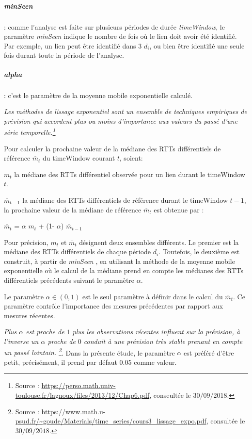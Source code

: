 \subparagraph{minSeen} : comme l'analyse est faite sur plusieurs périodes de durée \textit{timeWindow}, le paramètre \textit{minSeen} indique le nombre de fois où le lien doit avoir été identifié. Par exemple, un lien peut être identifié dans $3$ $d_i$, ou bien être identifié  une seule fois durant toute la période de l'analyse.

\subparagraph{alpha}: c'est le paramètre de la  moyenne mobile exponentielle calculé.

\guillemotleft \textit{ Les méthodes de lissage exponentiel  sont un ensemble de techniques empiriques de prévision qui accordent plus ou moins d'importance aux valeurs du passé d'une série temporelle.\footnote{Source : \url{https://perso.math.univ-toulouse.fr/lagnoux/files/2013/12/Chap6.pdf}, conseultée le $30/09/2018.$}} \guillemotright

Pour calculer la prochaine  valeur de la médiane des RTTs différentiels de référence $ \overline{m}_{t}$ du timeWindow  courant $ t $, soient: 

$m_t$ la médiane des RTTs différentiel observée pour un lien durant le timeWindow $t$. 

$ \overline{m}_{t-1}$  la médiane des  RTTs différentiels  de référence durant le timeWindow $ t-1 $,  la prochaine  valeur de la médiane de référence $ \overline{m}_{t}$ est obtenue par : 

\begin{center}
	$ \overline{m}_{t}$ =  $\alpha$ ${m}_{t}$ + (1-  $\alpha$) $ \overline{m}_{t-1}$
\end{center}
Pour précision, $m_t$ et $ \overline{m}_{t}$ désignent deux ensembles différents. Le premier est la médiane des RTTs différentiels de chaque période $d_i$. Toutefois, le deuxième est construit, à partir de \textit{minSeen} , en utilisant la méthode de la moyenne mobile exponentielle où le calcul de la médiane prend en compte les médianes des RTTs différentiels précédents suivant le paramètre $\alpha$.

Le paramètre  $\alpha \in (0, 1)$ est le seul paramètre à définir dans le calcul du $ \overline{m}_{t}$.  Ce paramètre contrôle l'importance  des mesures précédentes par rapport aux mesures récentes.

\guillemotleft \textit{Plus $\alpha$ est proche de $ 1 $ plus les observations récentes influent sur la prévision, à l'inverse un $\alpha$ proche de $0$ conduit à une prévision très stable prenant en compte un passé lointain. \footnote{Source : \url{https://www.math.u-psud.fr/~goude/Materials/time_series/cours3_lissage_expo.pdf}, consultée le $30/09/2018$.}}\guillemotright.  Dans la présente étude, le paramètre $\alpha$ est préféré d'être petit, précisément, il prend par défaut $0.05$ comme valeur.


